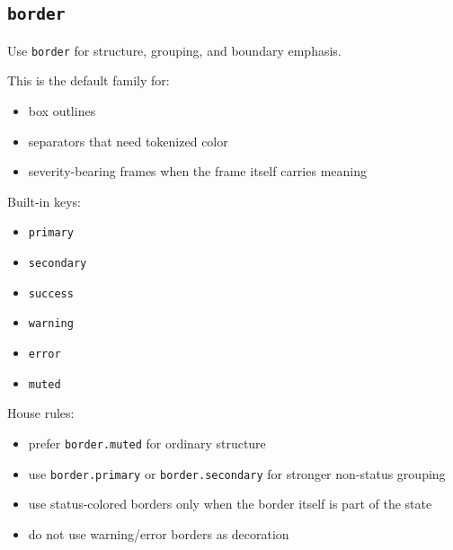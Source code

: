 \subsection{\texorpdfstring{\texttt{b\allowbreak{}o\allowbreak{}r\allowbreak{}d\allowbreak{}e\allowbreak{}r}}{}}\label{record-028-border}

Use \texttt{b\allowbreak{}o\allowbreak{}r\allowbreak{}d\allowbreak{}e\allowbreak{}r} for structure, grouping, and boundary emphasis.

This is the default family for:

\begin{itemize}
\tightlist
\item
  box outlines
\item
  separators that need tokenized color
\item
  severity-bearing frames when the frame itself carries meaning
\end{itemize}

Built-in keys:

\begin{itemize}
\tightlist
\item
  \texttt{p\allowbreak{}r\allowbreak{}i\allowbreak{}m\allowbreak{}a\allowbreak{}r\allowbreak{}y}
\item
  \texttt{s\allowbreak{}e\allowbreak{}c\allowbreak{}o\allowbreak{}n\allowbreak{}d\allowbreak{}a\allowbreak{}r\allowbreak{}y}
\item
  \texttt{s\allowbreak{}u\allowbreak{}c\allowbreak{}c\allowbreak{}e\allowbreak{}s\allowbreak{}s}
\item
  \texttt{w\allowbreak{}a\allowbreak{}r\allowbreak{}n\allowbreak{}i\allowbreak{}n\allowbreak{}g}
\item
  \texttt{e\allowbreak{}r\allowbreak{}r\allowbreak{}o\allowbreak{}r}
\item
  \texttt{m\allowbreak{}u\allowbreak{}t\allowbreak{}e\allowbreak{}d}
\end{itemize}

House rules:

\begin{itemize}
\tightlist
\item
  prefer \texttt{b\allowbreak{}o\allowbreak{}r\allowbreak{}d\allowbreak{}e\allowbreak{}r\allowbreak{}.\allowbreak{}m\allowbreak{}u\allowbreak{}t\allowbreak{}e\allowbreak{}d} for ordinary structure
\item
  use \texttt{b\allowbreak{}o\allowbreak{}r\allowbreak{}d\allowbreak{}e\allowbreak{}r\allowbreak{}.\allowbreak{}p\allowbreak{}r\allowbreak{}i\allowbreak{}m\allowbreak{}a\allowbreak{}r\allowbreak{}y} or \texttt{b\allowbreak{}o\allowbreak{}r\allowbreak{}d\allowbreak{}e\allowbreak{}r\allowbreak{}.\allowbreak{}s\allowbreak{}e\allowbreak{}c\allowbreak{}o\allowbreak{}n\allowbreak{}d\allowbreak{}a\allowbreak{}r\allowbreak{}y} for stronger non-status grouping
\item
  use status-colored borders only when the border itself is part of the state
\item
  do not use warning/error borders as decoration
\end{itemize}

